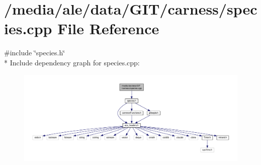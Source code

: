 \hypertarget{a00044}{\section{/media/ale/data/\-G\-I\-T/carness/species.cpp File Reference}
\label{a00044}
}
{\ttfamily \#include \char`\"{}species.\-h\char`\"{}}\\*
Include dependency graph for species.\-cpp\-:\nopagebreak
\begin{figure}[H]
\begin{center}
\leavevmode
\includegraphics[width=350pt]{a00079}
\end{center}
\end{figure}
